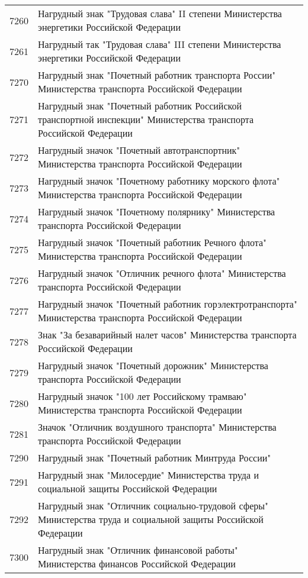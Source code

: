 \documentclass[10pt, a4paper, titlepage]{article}
\begin{document}
\begin{center}
\begin{longtable}{rp{}}
        7260 & Нагрудный знак "Трудовая слава" II степени Министерства энергетики Российской Федерации \\
        7261 & Нагрудный так "Трудовая слава" III степени Министерства энергетики Российской Федерации \\
        7270 & Нагрудный знак "Почетный работник транспорта России" Министерства транспорта Российской Федерации \\
        7271 & Нагрудный знак "Почетный работник Российской транспортной инспекции" Министерства транспорта Российской Федерации \\
        7272 & Нагрудный значок "Почетный автотранспортник" Министерства транспорта Российской Федерации \\
        7273 & Нагрудный значок "Почетному работнику морского флота" Министерства транспорта Российской Федерации \\
        7274 & Нагрудный значок "Почетному полярнику" Министерства транспорта Российской Федерации \\
        7275 & Нагрудный значок "Почетный работник Речного флота" Министерства транспорта Российской Федерации \\
        7276 & Нагрудный значок "Отличник речного флота" Министерства транспорта Российской Федерации \\
        7277 & Нагрудный значок "Почетный работник горэлектротранспорта" Министерства транспорта Российской Федерации \\
        7278 & Знак "За безаварийный налет часов" Министерства транспорта Российской Федерации \\
        7279 & Нагрудный значок "Почетный дорожник" Министерства транспорта Российской Федерации \\
        7280 & Нагрудный значок "100 лет Российскому трамваю" Министерства транспорта Российской Федерации \\
        7281 & Значок "Отличник воздушного транспорта" Министерства транспорта Российской Федерации \\
        7290 & Нагрудный знак "Почетный работник Минтруда России" \\
        7291 & Нагрудный знак "Милосердие" Министерства труда и социальной защиты Российской Федерации \\
        7292 & Нагрудный знак "Отличник социально-трудовой сферы" Министерства труда и социальной защиты Российской Федерации \\
        7300 & Нагрудный знак "Отличник финансовой работы" Министерства финансов Российской Федерации \\

\end{longtable}
\end{center}
\end{document}
